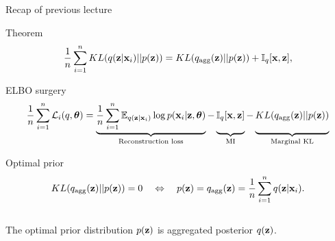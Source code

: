 \begin{frame}{Recap of previous lecture}
	\begin{block}{Theorem}
		\vspace{-0.3cm}
		\[
			\frac{1}{n} \sum_{i=1}^n KL(q(\mathbf{z} | \mathbf{x}_i) || p(\mathbf{z})) = KL(q_{\text{agg}}(\mathbf{z}) || p(\mathbf{z})) + \mathbb{I}_{q} [\mathbf{x}, \mathbf{z}],
		\]
		\vspace{-0.3cm}
	\end{block}
	
	\begin{block}{ELBO surgery}
		\vspace{-0.6cm}
		{\small
		\[
		    \frac{1}{n} \sum_{i=1}^n \cL_i(q, \btheta) = \underbrace{\frac{1}{n} \sum_{i=1}^n \mathbb{E}_{q(\bz | \bx_i)} \log p(\bx_i | \bz, \btheta)}_{\text{Reconstruction loss}}
		    - \underbrace{\vphantom{ \sum_{i=1}^n} \bbI_q [\bx, \bz]}_{\text{MI}} - \underbrace{\vphantom{ \sum_{i=1}^n} KL(q_{\text{agg}}(\bz) || p(\bz))}_{\text{Marginal KL}}
		\]}
	\end{block}
	\vspace{-0.8cm}
	\begin{block}{Optimal prior}
		\vspace{-0.6cm}
		\[
			KL(q_{\text{agg}}(\mathbf{z}) || p(\mathbf{z})) = 0 \quad \Leftrightarrow \quad p (\mathbf{z}) = q_{\text{agg}}(\mathbf{z}) = \frac{1}{n} \sum_{i=1}^n q(\mathbf{z} | \mathbf{x}_i).
		\]
		\vspace{-0.3cm}\\
		The optimal prior distribution $p(\mathbf{z})$ is aggregated posterior $q(\mathbf{z})$.
	\end{block}
\end{frame}
